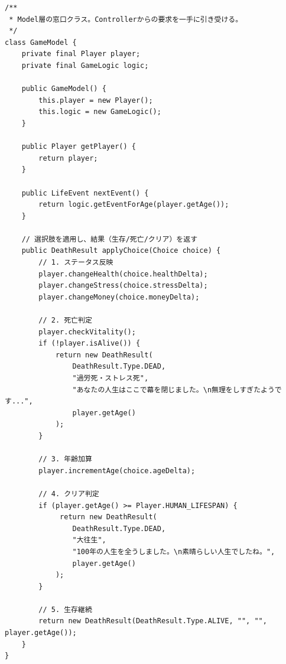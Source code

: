 \documentclass[a4paper,11pt]{jsarticle}
\begin{document}
\begin{lstlisting}[caption=GameModel.java（統合ファサード）]
/**
 * Model層の窓口クラス。Controllerからの要求を一手に引き受ける。
 */
class GameModel {
    private final Player player;
    private final GameLogic logic;

    public GameModel() {
        this.player = new Player();
        this.logic = new GameLogic();
    }

    public Player getPlayer() {
        return player;
    }

    public LifeEvent nextEvent() {
        return logic.getEventForAge(player.getAge());
    }

    // 選択肢を適用し、結果（生存/死亡/クリア）を返す
    public DeathResult applyChoice(Choice choice) {
        // 1. ステータス反映
        player.changeHealth(choice.healthDelta);
        player.changeStress(choice.stressDelta);
        player.changeMoney(choice.moneyDelta);
        
        // 2. 死亡判定
        player.checkVitality();
        if (!player.isAlive()) {
            return new DeathResult(
                DeathResult.Type.DEAD, 
                "過労死・ストレス死", 
                "あなたの人生はここで幕を閉じました。\n無理をしすぎたようです...", 
                player.getAge()
            );
        }

        // 3. 年齢加算
        player.incrementAge(choice.ageDelta);

        // 4. クリア判定
        if (player.getAge() >= Player.HUMAN_LIFESPAN) {
             return new DeathResult(
                DeathResult.Type.DEAD, 
                "大往生", 
                "100年の人生を全うしました。\n素晴らしい人生でしたね。", 
                player.getAge()
            );
        }

        // 5. 生存継続
        return new DeathResult(DeathResult.Type.ALIVE, "", "", player.getAge());
    }
}
\end{lstlisting}
\end{document}
